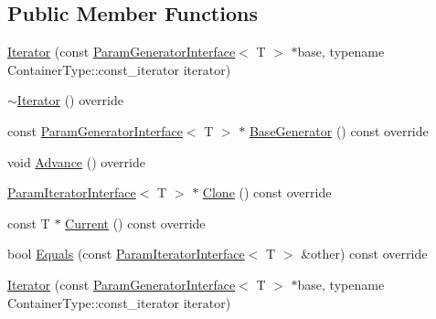 \subsection*{Public Member Functions}
\begin{DoxyCompactItemize}
\item 
\mbox{\hyperlink{classtesting_1_1internal_1_1_values_in_iterator_range_generator_1_1_iterator_aebd635efe7082e6fc45bb8ae0dbefd2e}{Iterator}} (const \mbox{\hyperlink{classtesting_1_1internal_1_1_param_generator_interface}{Param\+Generator\+Interface}}$<$ T $>$ $\ast$base, typename Container\+Type\+::const\+\_\+iterator iterator)
\item 
\mbox{\hyperlink{classtesting_1_1internal_1_1_values_in_iterator_range_generator_1_1_iterator_a265c1facb4cbd4669686d5f331df4a95}{$\sim$\+Iterator}} () override
\item 
const \mbox{\hyperlink{classtesting_1_1internal_1_1_param_generator_interface}{Param\+Generator\+Interface}}$<$ T $>$ $\ast$ \mbox{\hyperlink{classtesting_1_1internal_1_1_values_in_iterator_range_generator_1_1_iterator_a27445e4d010ffde9d3f2f9ada5d54d0f}{Base\+Generator}} () const override
\item 
void \mbox{\hyperlink{classtesting_1_1internal_1_1_values_in_iterator_range_generator_1_1_iterator_a5ff56489536cf5d90ed0ac07ffeb476b}{Advance}} () override
\item 
\mbox{\hyperlink{classtesting_1_1internal_1_1_param_iterator_interface}{Param\+Iterator\+Interface}}$<$ T $>$ $\ast$ \mbox{\hyperlink{classtesting_1_1internal_1_1_values_in_iterator_range_generator_1_1_iterator_a2c5ccf4da12cfb089829438d679ae35e}{Clone}} () const override
\item 
const T $\ast$ \mbox{\hyperlink{classtesting_1_1internal_1_1_values_in_iterator_range_generator_1_1_iterator_a55bd2a0d5a630478e32ec2efe08e37e4}{Current}} () const override
\item 
bool \mbox{\hyperlink{classtesting_1_1internal_1_1_values_in_iterator_range_generator_1_1_iterator_a75604bc318aca22ff8607b68bfb44e96}{Equals}} (const \mbox{\hyperlink{classtesting_1_1internal_1_1_param_iterator_interface}{Param\+Iterator\+Interface}}$<$ T $>$ \&other) const override
\item 
\mbox{\hyperlink{classtesting_1_1internal_1_1_values_in_iterator_range_generator_1_1_iterator_aebd635efe7082e6fc45bb8ae0dbefd2e}{Iterator}} (const \mbox{\hyperlink{classtesting_1_1internal_1_1_param_generator_interface}{Param\+Generator\+Interface}}$<$ T $>$ $\ast$base, typename Container\+Type\+::const\+\_\+iterator iterator)

\end{DoxyCompactItemize}
